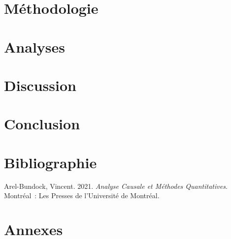 \documentclass[
  12pt,
  letterpaper,
]{report}
\newlength{\cslhangindent}
\newenvironment{CSLReferences}[2] %
 {\begin{list}{}{%
  \setlength{\itemindent}{0pt}
  \setlength{\leftmargin}{0pt}
  \setlength{\parsep}{0pt}
  \ifodd #1
   \setlength{\leftmargin}{\cslhangindent}
   \setlength{\itemindent}{-1\cslhangindent}
  \fi
  \setlength{\itemsep}{#2\baselineskip}}}
 {\end{list}}
\begin{document}

\chapter{Méthodologie}\label{muxe9thodologie}


\chapter{Analyses}\label{analyses}


\chapter{Discussion}\label{discussion}


\chapter{Conclusion}\label{conclusion}


\chapter*{Bibliographie}\label{bibliographie}


\label{refs}
\begin{CSLReferences}{1}{0}
Arel-Bundock, Vincent. 2021. \emph{Analyse Causale et M{é}thodes
Quantitatives}. Montr{é}al~: Les Presses de l'Universit{é} de
Montr{é}al.

\end{CSLReferences}

\cleardoublepage
{}
{}
\appendix

\chapter{\texorpdfstring{{Annexes}}{Annexes}}\label{annexes-1}
\end{document}
